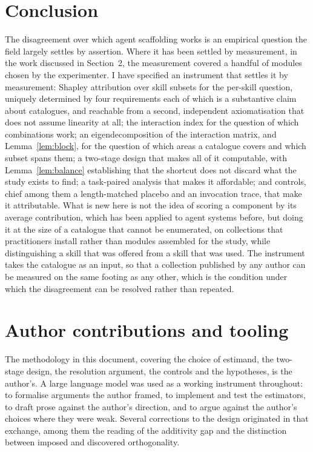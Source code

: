 \documentclass[11pt]{article}
\theoremstyle{plain}
\theoremstyle{definition}
\theoremstyle{remark}
\begin{document}
\section{Conclusion}

The disagreement over which agent scaffolding works is an empirical question the field largely settles by assertion. Where it has been settled by measurement, in the work discussed in Section~2, the measurement covered a handful of modules chosen by the experimenter. I have specified an instrument that settles it by measurement: Shapley attribution over skill subsets for the per-skill question, uniquely determined by four requirements each of which is a substantive claim about catalogues, and reachable from a second, independent axiomatisation that does not assume linearity at all; the interaction index for the question of which combinations work; an eigendecomposition of the interaction matrix, and Lemma~\ref{lem:block}, for the question of which areas a catalogue covers and which subset spans them; a two-stage design that makes all of it computable, with Lemma~\ref{lem:balance} establishing that the shortcut does not discard what the study exists to find; a task-paired analysis that makes it affordable; and controls, chief among them a length-matched placebo and an invocation trace, that make it attributable. What is new here is not the idea of scoring a component by its average contribution, which has been applied to agent systems before, but doing it at the size of a catalogue that cannot be enumerated, on collections that practitioners install rather than modules assembled for the study, while distinguishing a skill that was offered from a skill that was used. The instrument takes the catalogue as an input, so that a collection published by any author can be measured on the same footing as any other, which is the condition under which the disagreement can be resolved rather than repeated.

\section*{Author contributions and tooling}

The methodology in this document, covering the choice of estimand, the two-stage design, the resolution argument, the controls and the hypotheses, is the author's. A large language model was used as a working instrument throughout: to formalise arguments the author framed, to implement and test the estimators, to draft prose against the author's direction, and to argue against the author's choices where they were weak. Several corrections to the design originated in that exchange, among them the reading of the additivity gap and the distinction between imposed and discovered orthogonality.
\end{document}
